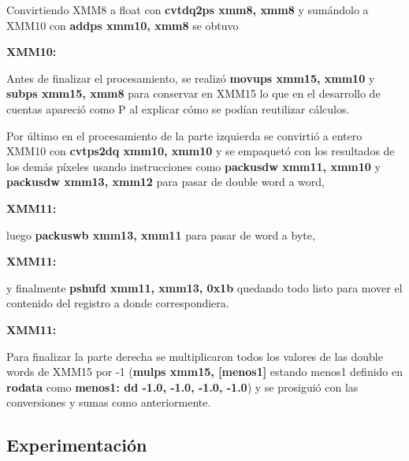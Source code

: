 \par{Convirtiendo XMM8 a float con \textbf{cvtdq2ps xmm8, xmm8} y sumándolo a XMM10 con \textbf{addps xmm10, xmm8} se obtuvo}
\par{\textbf{XMM10:}}
\par{Antes de finalizar el procesamiento, se realizó \textbf{movups xmm15, xmm10} y \textbf{subps xmm15, xmm8} para conservar en XMM15 lo que en el desarrollo de cuentas apareció como P al explicar cómo se podían reutilizar cálculos.}
\par{Por último en el procesamiento de la parte izquierda se convirtió a entero XMM10 con \textbf{cvtps2dq xmm10, xmm10} y se empaquetó con los resultados de los demás píxeles usando instrucciones como \textbf{packusdw xmm11, xmm10} y \textbf{packusdw xmm13, xmm12} para pasar de double word a word,}
\par{\textbf{XMM11:}}
\par{luego \textbf{packuswb xmm13, xmm11} para pasar de word a byte,}
\par{\textbf{XMM11:}}
\par{y finalmente \textbf{pshufd xmm11, xmm13, 0x1b} quedando todo listo para mover el contenido del registro a donde correspondiera.}
\par{\textbf{XMM11:}}
\par{Para finalizar la parte derecha se multiplicaron todos los valores de las double words de XMM15 por -1 (\textbf{mulps xmm15, [menos1]} estando menos1 definido en \textbf{rodata} como \textbf{menos1: dd -1.0, -1.0, -1.0, -1.0}) y se prosiguió con las conversiones y sumas como anteriormente.}

	
\subsection{Experimentación}

